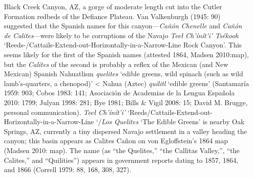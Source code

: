 Black Creek Canyon, AZ, a gorge of moderate length cut into the Cutler Formation redbeds of the Defiance Plateau.  Van Valkenburgh (1945: 90) suggested that the Spanish names for this canyon---\textit{Cañón Chenelle} and \textit{Cañón de Calites}---were likely to be corruptions of the Navajo\textit{ Teeł Ch'ínít'i' Tsékooh} ‘Reeds-/Cattails-Extend-out-Horizontally-in-a-Narrow-Line Rock Canyon’.  This seems likely for the first of the Spanish names (attested 1864, Madsen 2010:map), but the \textit{Calites} of the second is probably a reflex of the Mexican (and New Mexican) Spanish Nahuatlism \textit{quelites} ‘edible greens, wild spinach (such as wild lamb’s-quarters, a chenopod)’ {\textless} Nahua (Aztec) \textit{quilitl} ‘edible greens’ (Santamaría 1959: 903; Cobos 1983: 141; Asociación de Academias de la Lengua Española 2010: 1799;  Julyan 1998: 281; Bye 1981; Bills \& Vigil 2008: 15; David M. Brugge, personal communication).  \textit{Teeł Ch'ínít'i'} ‘Reeds/Cattails-Extend-out-Horizontally-in-a-Narrow-Line ‘/\textit{Los Quelites} ‘The Edible Greens’ is nearby Oak Springs, AZ, currently a tiny dispersed Navajo settlement in a valley heading the canyon; this basin appears as Calites Cañon on von Egloffstein’s 1864 map (Madsen 2010: map). The name (as ``the Quelites,'' ``the Callitas Valley,'', ``the Calites,'' and ``Quilities'') appears in government reports dating to 1857, 1864, and 1866 (Correll 1979: 88, 168, 308, 327).

